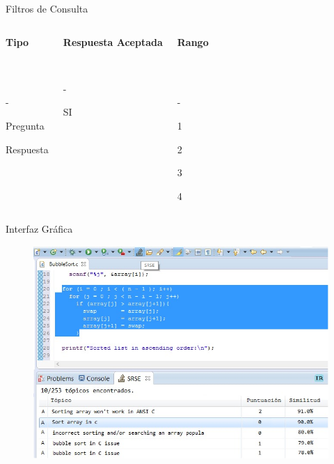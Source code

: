 \documentclass{beamer}
\begin{document}
\begin{frame}{Filtros de Consulta}
\begin{columns}[T]

\begin{center}
\textbf{Tipo\\~}

~

-

Pregunta

Respuesta
\end{center}

\begin{center}
\textbf{Respuesta Aceptada}

~

-

SI
\end{center}
\begin{center}
\textbf{Rango\\~}

~

-

1

2

3

4
\end{center}
\end{columns}
\end{frame}

\begin{frame}{Interfaz Gráfica}
\begin{figure}
\includegraphics[width=0.8\linewidth]{srse}
\end{figure}
\end{frame}
\end{document}
